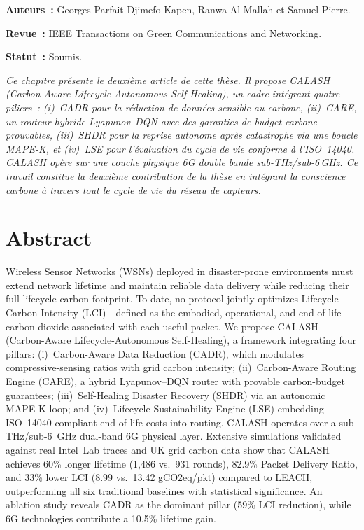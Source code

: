 \label{sec:Theme2}

\vspace{0.5cm}
\noindent\textbf{Auteurs~:} Georges Parfait Djimefo Kapen, Ranwa Al Mallah et Samuel Pierre.

\noindent\textbf{Revue~:} IEEE Transactions on Green Communications and Networking.

\noindent\textbf{Statut~:} Soumis.

\vspace{0.3cm}
\noindent\textit{Ce chapitre présente le deuxième article de cette thèse. Il propose CALASH (Carbon-Aware Lifecycle-Autonomous Self-Healing), un cadre intégrant quatre piliers~: (i)~CADR pour la réduction de données sensible au carbone, (ii)~CARE, un routeur hybride Lyapunov--DQN avec des garanties de budget carbone prouvables, (iii)~SHDR pour la reprise autonome après catastrophe via une boucle MAPE-K, et (iv)~LSE pour l'évaluation du cycle de vie conforme à l'ISO~14040. CALASH opère sur une couche physique 6G double bande sub-THz/sub-6\,GHz. Ce travail constitue la deuxième contribution de la thèse en intégrant la conscience carbone à travers tout le cycle de vie du réseau de capteurs.}

\vspace{0.5cm}

\section{Abstract}
Wireless Sensor Networks (WSNs) deployed in disaster-prone environments must extend network lifetime and maintain reliable data delivery while reducing their full-lifecycle carbon footprint.
To date, no protocol jointly optimizes Lifecycle Carbon Intensity (LCI)---defined as the embodied, operational, and end-of-life carbon dioxide associated with each useful packet.
We propose CALASH (Carbon-Aware Lifecycle-Autonomous Self-Healing), a framework integrating four pillars: (i)~Carbon-Aware Data Reduction (CADR), which modulates compressive-sensing ratios with grid carbon intensity; (ii)~Carbon-Aware Routing Engine (CARE), a hybrid Lyapunov--DQN router with provable carbon-budget guarantees; (iii)~Self-Healing Disaster Recovery (SHDR) via an autonomic MAPE-K loop; and (iv)~Lifecycle Sustainability Engine (LSE) embedding ISO~14040-compliant end-of-life costs into routing.
CALASH operates over a sub-THz/sub-6~GHz dual-band 6G physical layer.
Extensive simulations validated against real Intel~Lab traces and UK grid carbon data show that CALASH achieves 60\% longer lifetime (1,486 vs.\ 931 rounds), 82.9\% Packet Delivery Ratio, and 33\% lower LCI (8.99 vs.\ 13.42 gCO2eq/pkt) compared to LEACH, outperforming all six traditional baselines with statistical significance.
An ablation study reveals CADR as the dominant pillar (59\% LCI reduction), while 6G technologies contribute a 10.5\% lifetime gain.


